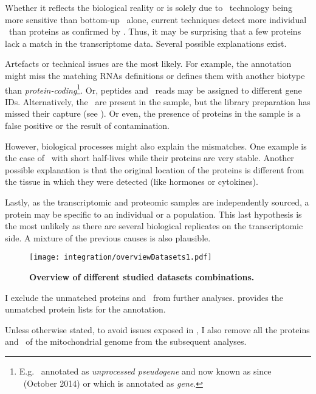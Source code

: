 Whether it reflects the biological reality or
is solely due to \Rnaseq\ technology being more sensitive than
bottom-up \ms\ alone,
current techniques detect more individual \mRNAs\ than proteins
as confirmed by .
Thus, it may be surprising that
a few proteins lack a match in the transcriptome data.
Several possible explanations exist.\mybr\

Artefacts or technical issues are the most likely.
For example, the annotation might miss
the matching \glspl{RNA} definitions
or defines them with another biotype than \emph{protein-coding}\footnote{%
E.g.\  annotated as \textit{unprocessed pseudogene}
and now known as  since ~(October 2014) or
 which is annotated as  \textit{gene}.%
}.
Or, peptides and \mRNA\ reads may be assigned to different gene IDs.
Alternatively, the \mRNAs\ are present in the sample,
but the library preparation has missed their capture
(see ).
Or even, the presence of proteins in the sample is a false positive
or the result of contamination.\mybr\

However, biological processes might also explain the mismatches.
One example is the case of \mRNAs\ with short half-lives
while their proteins are very stable.
Another possible explanation is that
the original location of the proteins is different
from the tissue in which they were detected
(like hormones or cytokines).\mybr\

Lastly, as the transcriptomic and proteomic samples are independently sourced,
a protein may be specific to an individual or a population.
This last hypothesis is the most unlikely
as there are several biological replicates on the transcriptomic side.
A mixture of the previous causes is also plausible.\mybr\

\begin{figure}[!htbp]
     \texttt{[image: integration/overviewDatasets1.pdf]}\centering
     \vspace{-3mm}
     \caption[Overview of different datasets combination]{%
     \label{fig:setsOverview}\textbf{Overview of different studied datasets
     combinations.}}
\end{figure}

I exclude the unmatched proteins and \mRNAs\ from further analyses.
 provides the unmatched protein lists
for the  annotation.\mybr\

Unless otherwise stated, to avoid issues exposed in ,
I also remove all the proteins and \mRNAs\ of the mitochondrial genome
from the subsequent analyses.\mybr\

